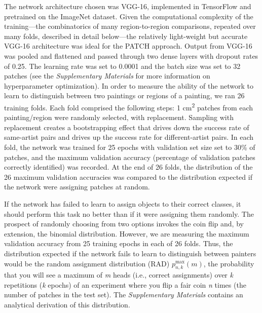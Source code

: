 \documentclass[11pt]{article}
\begin{document}
The network architecture chosen was VGG-16, implemented in TensorFlow
and pretrained on the ImageNet dataset. Given the computational
complexity of the training---the combinatorics of many region-to-region
comparisons, repeated over many folds, described in detail below---the
relatively light-weight but accurate VGG-16 architecture was ideal for
the PATCH approach. Output from VGG-16 was pooled and flattened and
passed through two dense layers with dropout rates of 0.25. The learning
rate was set to 0.0001 and the batch size was set to 32 patches (see the
\emph{Supplementary Materials} for more information on hyperparameter
optimization). In order to measure the ability of the network to learn
to distinguish between two paintings or regions of a painting, we ran 26
training folds. Each fold comprised the following steps: 1
cm\textsuperscript{2} patches from each painting/region were randomly
selected, with replacement. Sampling with replacement creates a
bootstrapping effect that drives down the success rate of same-artist
pairs and drives up the success rate for different-artist pairs. In each
fold, the network was trained for 25 epochs with validation set size set
to 30\% of patches, and the maximum validation accuracy (percentage of
validation patches correctly identified) was recorded. At the end of 26
folds, the distribution of the 26 maximum validation accuracies was
compared to the distribution expected if the network were assigning
patches at random.


If the network has failed to learn to assign objects to their correct
classes, it should perform this task no better than if it were assigning
them randomly. The prospect of randomly choosing from two options
invokes the coin flip and, by extension, the binomial distribution.
However, we are measuring the maximum validation accuracy from 25
training epochs in each of 26 folds. Thus, the distribution expected if
the network fails to learn to distinguish between painters would be the
random assignment distribution (RAD) \(p_{n,k}^{\max}(m)\), the
probability that you will see a maximum of \emph{m} heads (i.e., correct
assignments) over \emph{k} repetitions (\emph{k} epochs) of an
experiment where you flip a fair coin \emph{n} times (the number of
patches in the test set). The \emph{Supplementary Materials} contains an
analytical derivation of this distribution.
\end{document}
